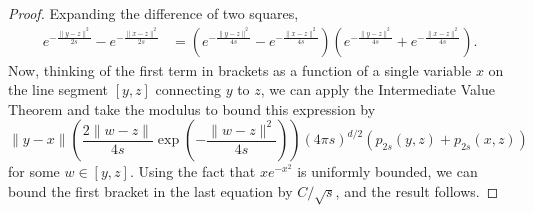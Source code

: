 \documentclass[EJP]{ejpecp} %
\begin{document}
\begin{proof}

    Expanding the difference of two squares,
    \begin{align*}
        e^{- \frac{\|y-z\|^2}{2 s}}
        -
        e^{- \frac{\|x-z\|^2}{2 s}}
        &=
        \left(
            e^{-\frac{\|y-z\|^2}{4 s}}
            -
            e^{-\frac{\|x-z\|^2}{4 s}}
        \right)
        \left(
            e^{-\frac{\|y-z\|^2}{4 s}}
            +
            e^{-\frac{\|x-z\|^2}{4 s}}
        \right) .
    \end{align*}
Now, thinking of the first term in brackets as a function of a single variable $x$ on
the line segment $[y,z]$ connecting $y$ to $z$, we can apply the
Intermediate Value Theorem and take the modulus to bound this expression by 
    \[
        \|y-x\|
        \left( \frac{2\|w-z\|}{4s} \exp\left(-\frac{\|w-z\|^2}{4s}\right)\right)
        (4 \pi s)^{d/2}
        \left( p_{2s}(y,z)+p_{2s}(x,z) \right)
    \]
    for some $w\in [y,z]$.
    Using the fact that $x e^{-x^2}$ is uniformly bounded,
    we can bound the first bracket in the last equation by $C/\sqrt{s}$, and the result follows.
\end{proof}
\end{document}
